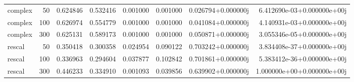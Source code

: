 \begin{tabular}{lrrrrrrr}
 complex &   50 &  0.624846 &  0.532416 &  0.001000 &  0.001000 &  0.026794+0.000000j &  6.412690e-03+0.000000e+00j \\
 complex &  100 &  0.626974 &  0.554779 &  0.001000 &  0.001000 &  0.041084+0.000000j &  4.140931e-03+0.000000e+00j \\
 complex &  300 &  0.625131 &  0.589173 &  0.001000 &  0.001000 &  0.050871+0.000000j &  3.055346e-05+0.000000e+00j \\
  rescal &   50 &  0.350418 &  0.300358 &  0.024954 &  0.090122 &  0.703242+0.000000j &  3.834408e-37+0.000000e+00j \\
  rescal &  100 &  0.336963 &  0.294604 &  0.037877 &  0.102842 &  0.701861+0.000000j &  5.383412e-36+0.000000e+00j \\
  rescal &  300 &  0.446233 &  0.334910 &  0.001093 &  0.039856 &  0.639902+0.000000j &  1.000000e+00+0.000000e+00j \\
\bottomrule
\end{tabular}
